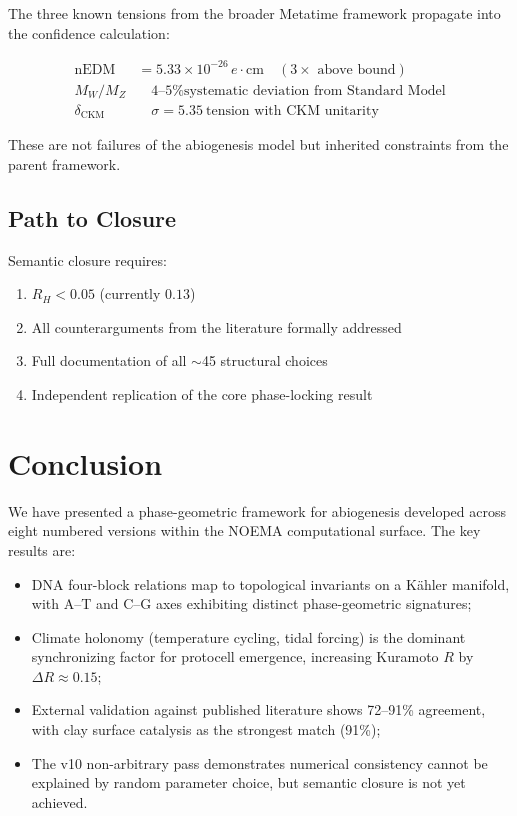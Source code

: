 \documentclass[11pt,a4paper]{article}
\begin{document}
The three known tensions from the broader Metatime framework propagate into the confidence calculation:

\begin{align}
\text{nEDM} &= 5.33 \times 10^{-26}\,e\cdot\text{cm} \quad (\text{3$\times$ above bound}) \\
M_W/M_Z &\quad \text{4--5\% systematic deviation from Standard Model} \\
\delta_{\text{CKM}} &\quad \sigma = 5.35\ \text{tension with CKM unitarity}
\end{align}

These are not failures of the abiogenesis model but inherited constraints from the parent framework.

\subsection{Path to Closure}

Semantic closure requires:

\begin{enumerate}
    \item $R_H < 0.05$ (currently $0.13$)
    \item All counterarguments from the literature formally addressed
    \item Full documentation of all $\sim$45 structural choices
    \item Independent replication of the core phase-locking result
\end{enumerate}

\section{Conclusion}

We have presented a phase-geometric framework for abiogenesis developed across eight numbered versions within the NOEMA computational surface. The key results are:

\begin{itemize}
    \item DNA four-block relations map to topological invariants on a K\"ahler manifold, with A--T and C--G axes exhibiting distinct phase-geometric signatures;
    \item Climate holonomy (temperature cycling, tidal forcing) is the dominant synchronizing factor for protocell emergence, increasing Kuramoto $R$ by $\Delta R \approx 0.15$;
    \item External validation against published literature shows 72--91\% agreement, with clay surface catalysis as the strongest match (91\%);
    \item The v10 non-arbitrary pass demonstrates numerical consistency cannot be explained by random parameter choice, but semantic closure is not yet achieved.
\end{itemize}
\end{document}
